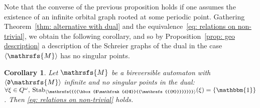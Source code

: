 \documentclass{amsart}
\newtheorem{corollary}[theorem]{Corollary}
\begin{document}
Note that the converse  of the previous proposition holds if one assumes the existence of an infinite orbital graph rooted at some periodic point. Gathering Theorem~\ref{thm: alternative with dual} and the equivalence~\eqref{eq: relations on non-trivial}, we obtain the following corollary, and so by Proposition~\ref{prop: geo description} a description of the Schreier graphs of the dual in the case ${{{\langle}{{\mathrsfs{{{M}}}}}{\rangle}}}$ has no singular points.
\begin{corollary}\label{cor: charact}
Let ${{{\mathrsfs{{M}}}}}$ be a bireversible automaton with ${\hbox{$\langle{{\hbox{$\mathfrak{d}$}}{{{\mathrsfs{{M}}}}}}\rangle$}}$ infinite and no singular points in the dual: $\forall \xi \in {{{Q}}}^\omega,\: \operatorname{Stab}_{{{{\langle}{{\mathrsfs{{{{\hbox{$\mathfrak{d}$}}{{\mathrsfs{{{M}}}}}}}}}}{\rangle}}}}(\xi)= \{ \operatorname{\mathbbm{1}}\}$. Then \eqref{eq: relations on non-trivial} holds.
\end{corollary}
\end{document}
